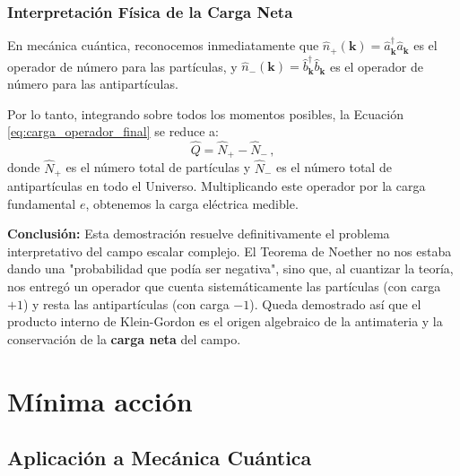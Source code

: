 \subsection{Interpretación Física de la Carga Neta}

En mecánica cuántica, reconocemos inmediatamente que $\hat{n}_+(\mathbf{k}) = \hat{a}_\mathbf{k}^\dagger \hat{a}_\mathbf{k}$ es el operador de número para las partículas, y $\hat{n}_-(\mathbf{k}) = \hat{b}_\mathbf{k}^\dagger \hat{b}_\mathbf{k}$ es el operador de número para las antipartículas. 

Por lo tanto, integrando sobre todos los momentos posibles, la Ecuación \eqref{eq:carga_operador_final} se reduce a:
\begin{equation}
    \hat{Q} = \hat{N}_+ - \hat{N}_- \, ,
\end{equation}
donde $\hat{N}_+$ es el número total de partículas y $\hat{N}_-$ es el número total de antipartículas en todo el Universo. Multiplicando este operador por la carga fundamental $e$, obtenemos la carga eléctrica medible.

\textbf{Conclusión:} Esta demostración resuelve definitivamente el problema interpretativo del campo escalar complejo. El Teorema de Noether no nos estaba dando una "probabilidad que podía ser negativa", sino que, al cuantizar la teoría, nos entregó un operador que cuenta sistemáticamente las partículas (con carga $+1$) y resta las antipartículas (con carga $-1$). Queda demostrado así que el producto interno de Klein-Gordon es el origen algebraico de la antimateria y la conservación de la \textbf{carga neta} del campo.

\chapter{Mínima acción}


\section{Aplicaci\'on a Mec\'anica Cu\'antica}
\label{sec:aplic-mecan-cuant}

